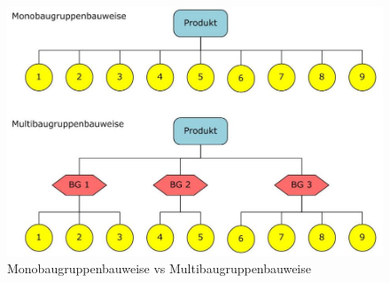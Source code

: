 \begin{figure}[h]
	\centering
	\includegraphics[scale=0.4]{Bauweise4.jpg}
	\caption{Monobaugruppenbauweise vs Multibaugruppenbauweise}
\end{figure}

















